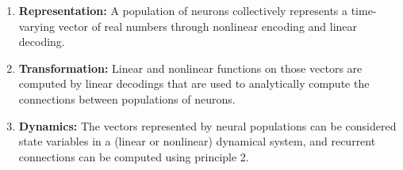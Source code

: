 \documentclass{frontiersSCNS}
\begin{document}
\begin{enumerate}
  \item \textbf{Representation:} A population of neurons
    collectively represents a time-varying vector of real numbers
    through nonlinear encoding and linear decoding.
  \item \textbf{Transformation:} Linear and nonlinear
    functions on those vectors
    are computed by linear decodings
    that are used to analytically compute
    the connections between populations of neurons.
  \item \textbf{Dynamics:} The vectors represented
    by neural populations can be considered state variables
    in a (linear or nonlinear) dynamical system,
    and recurrent connections can be computed
    using principle 2.
\end{enumerate}
\end{document}
